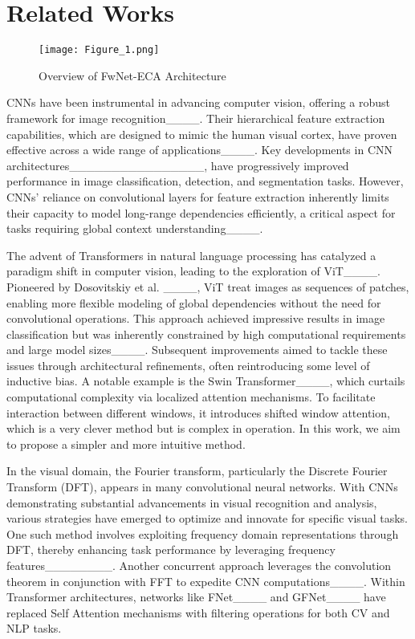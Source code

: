 \section{Related Works}
\begin{figure}[htbp]
    \centering
    \texttt{[image: Figure\_1.png]}
    \caption{Overview of FwNet-ECA Architecture}
    \label{fig:1}
\end{figure}

CNNs have been instrumental in advancing computer vision, offering a robust framework for image recognition____. Their hierarchical feature extraction capabilities, which are designed to mimic the human visual cortex, have proven effective across a wide range of applications____. Key developments in CNN architectures________________, have progressively improved performance in image classification, detection, and segmentation tasks. However, CNNs' reliance on convolutional layers for feature extraction inherently limits their capacity to model long-range dependencies efficiently, a critical aspect for tasks requiring global context understanding____. 

The advent of Transformers in natural language processing has catalyzed a paradigm shift in computer vision, leading to the exploration of ViT____. Pioneered by Dosovitskiy et al. ____, ViT treat images as sequences of patches, enabling more flexible modeling of global dependencies without the need for convolutional operations. This approach achieved impressive results in image classification but was inherently  constrained by high computational requirements and large model sizes____. Subsequent improvements aimed to tackle these issues through architectural refinements, often reintroducing some level of inductive bias. A notable example is the Swin Transformer____, which curtails computational complexity via localized attention mechanisms. To facilitate interaction between different windows, it introduces shifted window attention, which is a very clever method but is complex in operation. In this work, we aim to propose a simpler and more intuitive method.

In the visual domain, the Fourier transform, particularly the Discrete Fourier Transform (DFT), appears in many convolutional neural networks. With CNNs demonstrating substantial advancements in visual recognition and analysis, various strategies have emerged to optimize and innovate for specific visual tasks. One such method involves exploiting frequency domain representations through DFT, thereby enhancing task performance by leveraging frequency features________. Another concurrent approach leverages the convolution theorem in conjunction with FFT to expedite CNN computations____. Within Transformer architectures, networks like FNet____ and GFNet____ have replaced Self Attention mechanisms with filtering operations for both CV and NLP tasks.

